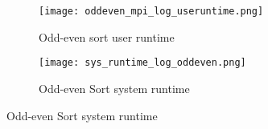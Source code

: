 \documentclass[11pt,twocolumn]{article}
\begin{document}
\begin{figure}[hbt!]
\begin{subfigure}{\textwidth}
\texttt{[image: oddeven\_mpi\_log\_useruntime.png]} 
\caption{Odd-even sort user runtime}
\label{fig:subim8}
\end{subfigure}
\begin{subfigure}{\textwidth}
\texttt{[image: sys\_runtime\_log\_oddeven.png]}
\caption{Odd-even Sort system runtime}
\label{fig:subim9}
\end{subfigure}
\end{figure}



    
\end{document}
